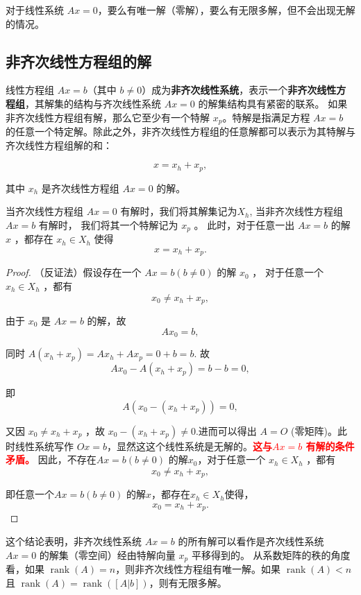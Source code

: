 对于线性系统 $Ax = 0$，要么有唯一解（零解），要么有无限多解，但不会出现无解的情况。

\subsection{非齐次线性方程组的解}

线性方程组 $Ax = b$（其中 $b \neq 0$）成为\textcolor{third}{\bf 非齐次线性系统}，表示一个\textcolor{third}{\bf 非齐次线性方程组}，其解集的结构与齐次线性系统 $Ax = 0$ 的解集结构具有紧密的联系。
如果非齐次线性方程组有解，那么它至少有一个特解 $x_p$。特解是指满足方程 $Ax = b$ 的任意一个特定解。除此之外，非齐次线性方程组的任意解都可以表示为其特解与齐次线性方程组解的和：

$$ x = x_h+x_p, $$

其中 $x_h$ 是齐次线性方程组 $Ax = 0$ 的解。

\begin{proposition}
    当齐次线性方程组 $A x=0$ 有解时，我们将其解集记为$X_h$, 当非齐次线性方程组 $A x=b$ 有解时，
我们将其一个特解记为 $x_p$ 。
此时，对于任意一出 $A x=b$ 的解 $x$ ，都存在 $x_h \in X_h$
使得
$$
x=x_h+x_p .
$$
\end{proposition}

\begin{proof}
（反证法）假设存在一个 $A x=b(b \neq 0)$ 的解 $x_0$ ，
对于任意一个 $x_h \in X_h$ ，都有
$$
x_0 \neq x_h+x_p,
$$

由于 $x_0$ 是 $A x=b$ 的解，故 
$$
A x_0=b,
$$

同时 $A\left(x_h+x_p\right)=A x_h+A x_p=0 + b = b$. 故
$$
A x_0 - A\left(x_h+x_p\right) = b-b=0,
$$

即
$$
A\left(x_0 - (x_h+x_p)\right) = 0,
$$

又因 $x_0 \neq x_h+x_p$ ，故 $x_0-\left(x_h+x_p\right) \neq 0$.进而可以得出 $A=O$ (零矩阵)。此时线性系统写作 $ O x=b$，显然这这个线性系统是无解的。\textcolor{red}{\bf 这与$A x=b$ 有解的条件矛盾。}
因此，不存在$A x=b(b \neq 0)$ 的解$x_0$，对于任意一个 $x_h \in X_h$ ，都有
$$
x_0 \neq x_h+x_p,
$$

即任意一个$A x=b(b \neq 0)$ 的解$x$，都存在$x_h \in X_h$使得，
$$
x_0 = x_h+x_p.
$$
\end{proof}

\vspace{0.3cm}

这个结论表明，非齐次线性系统 $Ax = b$ 的所有解可以看作是齐次线性系统 $Ax = 0$ 的解集（零空间）经由特解向量 $x_p$ 平移得到的。
从系数矩阵的秩的角度看，如果 $\operatorname{rank}(A) = n$，则非齐次线性方程组有唯一解。如果 $\operatorname{rank}(A) < n$ 且 $\operatorname{rank}(A) = \operatorname{rank}([A|b])$，则有无限多解。

